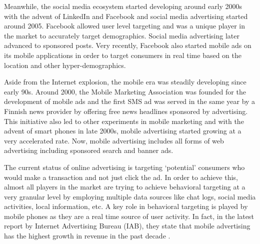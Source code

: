 Meanwhile, the social media ecosystem started developing around early 2000s with the advent of LinkedIn and Facebook and social media advertising started around 2005. Facebook allowed user level targeting and was a unique player in the market to accurately target demographics. Social media advertising later advanced to sponsored posts. Very recently, Facebook also started mobile ads on its mobile applications in order to target consumers in real time based on the location and other hyper-demographics.





Aside from the Internet explosion, the mobile era was steadily developing since early 90s. Around 2000, the Mobile Marketing Association was founded for the development of mobile ads and the first SMS ad was served in the same year by a Finnish news provider by offering free news headlines sponsored by advertising. This initiative also led to other experiments in mobile marketing and with the advent of smart phones in late 2000s, mobile advertising started growing at a very accelerated rate.  Now, mobile advertising includes all forms of web advertising including sponsored search and banner ads. 



The current status of online advertising is targeting `potential' consumers who would make a transaction and not just click the ad. In order to achieve this, almost all players in the market are trying to achieve behavioral targeting at a very granular level by employing multiple data sources like chat logs, social media activities, local information, etc. A key role in behavioral targeting is played by mobile phones as they are a real time source of user activity. In fact, in the latest report by Internet Advertising Bureau (IAB), they state that mobile advertising has the highest growth in revenue in the past decade \cite{IAB2016}.




